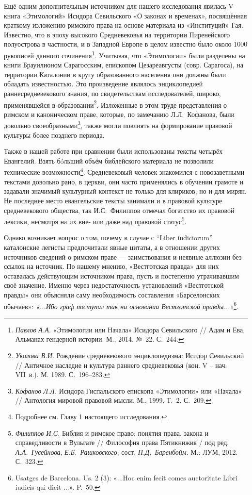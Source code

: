 Ещё одним дополнительным источником для нашего исследования явилась V книга «Этимологий» Исидора Севильского «О законах и временах», посвящённая краткому изложению римского права на основе материала из «Институций» Гая. Известно, что в эпоху высокого Средневековья на территории Пиренейского полуострова в частности, и в Западной Европе в целом известно было около 1000 рукописей данного сочинения\footnote{\emph{Павлов А.А.} «Этимологии или Начала» Исидора Севильского // Адам и Ева. Альманах гендерной истории. М., 2014. №~22. С.~244.}. Учитывая, что «Этимологии» были разделены на книги Брауилионом Сарагосским, епископом Цезареавгусты (совр. Сарагоса), на территории Каталонии в кругу образованного населения они должны были обладать известностью. Это произведение являлось энциклопедией раннесредневекового знания, по свидетельствам исследователей, широко, применявшейся в образовании\footnote{\emph{Уколова В.И. }Рождение средневекового энциклопедизма: Исидор Севильский // Античное наследие и культура раннего средневековья (кон. V -- нач. VII~в.). М. 1989. С.~196--283.}. Изложенные в этом труде представления о римском и каноническом праве, которые, по замечанию Л.Л.~Кофанова, были довольно своеобразными\footnote{\emph{Кофанов Л.Л.} Исидора Гиспальского епископа «Этимологии» или «Начала» // Антология мировой правовой мысли. М., 1999. Т.~2. С.~209.}, также могли повлиять на формирование правовой культуры более позднего периода.

Также в нашей работе при сравнении были использованы тексты четырёх Евангелий. Взять бóльший объём библейского материала не позволили технические возможности\footnote{Подробнее см. Главу 1 настоящего исследования.}. Средневековый человек знакомился с новозаветными текстами довольно рано, в церкви, они часто применялись в обучении грамоте и задавали значимый культурный контекст не только для клириков, но и для мирян. Не последнее место евангельские тексты занимали и в правовой культуре средневекового общества, так И.С.~Филиппов отмечал богатство их правовой лексики, несмотря на их вне- или даже над правовой статус\footnote{\emph{Филиппов И.С.} Библия и римское право: понятия права, закона и справедливости в Вульгате // Философия права Пятикнижия / под ред. \emph{А.А.~Гусейнова}, \emph{Е.Б.~Рашковского}; сост. \emph{П.Д.~Баренбойм}. М.: ЛУМ, 2012. С.~323.}.

Однако возникает вопрос о том, почему в случае с “Liber iudiciorum” каталонские легисты предпочитали явные цитаты, а в отношении других источников сведений о римском праве --- заимствования и неявные аллюзии без ссылок на источник. По нашему мнению, «Вестготская правда» для них оставалась действующим источником права, пусть и постепенно утрачивавшим своё значение. Именно через недостаточность установлений «Вестготской правды» они объясняли саму необходимость составления «Барселонских обычаев»: \emph{«...Ибо граф поступил так на основании Вестготской правды...»}\footnote{Usatges de Barcelona. Us. 2 (3): «...Hoc enim fecit comes auctoritate Libri iudicis qui dicit ...». P.~50.}\emph{.}

